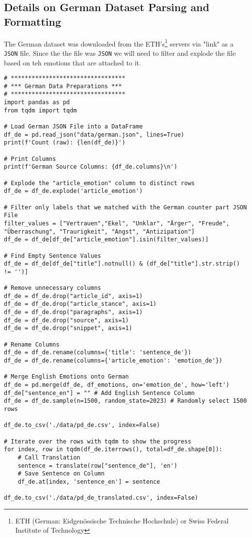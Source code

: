 \subsection{Details on German Dataset Parsing and Formatting}
\label{appendix:dataset_german}
The German dataset was downloaded from the ETH's\footnote{ETH (German: Eidgenössische Technische Hochschule) or Swiss Federal Institute of Technology} servers via "link" as a \texttt{JSON} file. Since the the file was \texttt{JSON} we will need to filter and explode the file based on teh emotions that are attached to it.
\begin{verbatim}
# *********************************
# *** German Data Preparations ***
# *********************************
import pandas as pd
from tqdm import tqdm

# Load German JSON File into a DataFrame
df_de = pd.read_json("data/german.json", lines=True)
print(f'Count (raw): {len(df_de)}')

# Print Columns
print(f'German Source Columns: {df_de.columns}\n')

# Explode the "article_emotion" column to distinct rows
df_de = df_de.explode('article_emotion')

# Filter only labels that we matched with the German counter part JSON File
filter_values = ["Vertrauen","Ekel", "Unklar", "Ärger", "Freude", "Überraschung", "Traurigkeit", "Angst", "Antizipation"]
df_de = df_de[df_de["article_emotion"].isin(filter_values)]

# Find Empty Sentence Values
df_de = df_de[df_de["title"].notnull() & (df_de["title"].str.strip() != '')]

# Remove unnecessary columns
df_de = df_de.drop("article_id", axis=1)
df_de = df_de.drop("article_stance", axis=1)
df_de = df_de.drop("paragraphs", axis=1)
df_de = df_de.drop("source", axis=1)
df_de = df_de.drop("snippet", axis=1)

# Rename Columns
df_de = df_de.rename(columns={'title': 'sentence_de'})
df_de = df_de.rename(columns={'article_emotion': 'emotion_de'})

# Merge English Emotions onto German
df_de = pd.merge(df_de, df_emotions, on='emotion_de', how='left')
df_de["sentence_en"] = "" # Add English Sentence Column
df_de = df_de.sample(n=1500, random_state=2023) # Randomly select 1500 rows

df_de.to_csv('./data/pd_de.csv', index=False)

# Iterate over the rows with tqdm to show the progress
for index, row in tqdm(df_de.iterrows(), total=df_de.shape[0]):
    # Call Translation
    sentence = translate(row["sentence_de"], 'en')
    # Save Sentence on Column
    df_de.at[index, 'sentence_en'] = sentence

df_de.to_csv('./data/pd_de_translated.csv', index=False)
\end{verbatim}
\clearpage
